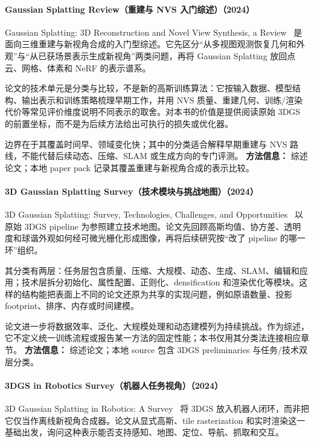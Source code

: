 \paragraph{Gaussian Splatting Review（重建与 NVS 入门综述）（2024）}
Gaussian Splatting: 3D Reconstruction and Novel View Synthesis, a Review~\cite{2405_03417} 是面向三维重建与新视角合成的入门型综述。它先区分“从多视图观测恢复几何和外观”与“从已获场景表示生成新视角”两类问题，再将 Gaussian Splatting 放回点云、网格、体素和 NeRF 的表示谱系。

论文的技术单元是分类与比较，不是新的高斯训练算法：它按输入数据、模型结构、输出表示和训练策略梳理早期工作，并用 NVS 质量、重建几何、训练/渲染代价等常见评价维度说明不同表示的取舍。对本书的价值是提供阅读原始 3DGS 的前置坐标，而不是为后续方法给出可执行的损失或优化器。

边界在于其覆盖时间早、领域变化快；其中的分类适合解释早期重建与 NVS 路线，不能代替后续动态、压缩、SLAM 或生成方向的专门评测。
\textbf{方法信息：} 综述论文；本地 paper pack 记录其覆盖重建与新视角合成的表示比较。
\paragraph{3D Gaussian Splatting Survey（技术模块与挑战地图）（2024）}
3D Gaussian Splatting: Survey, Technologies, Challenges, and Opportunities~\cite{2407_17418} 以原始 3DGS pipeline 为参照建立技术地图。论文先回顾高斯均值、协方差、透明度和球谐外观如何经可微光栅化形成图像，再将后续研究按“改了 pipeline 的哪一环”组织。

其分类有两层：任务层包含质量、压缩、大规模、动态、生成、SLAM、编辑和应用；技术层拆分初始化、属性配置、正则化、densification 和渲染优化等模块。这样的结构能把表面上不同的论文还原为共享的实现问题，例如原语数量、投影 footprint、排序、内存或时间建模。

论文进一步将数据效率、泛化、大规模处理和动态建模列为持续挑战。作为综述，它不定义统一训练流程或报告某一方法的固定性能；本书仅用其分类法连接相应章节。
\textbf{方法信息：} 综述论文；本地 source 包含 3DGS preliminaries 与任务/技术双层分类。
\paragraph{3DGS in Robotics Survey（机器人任务视角）（2024）}
3D Gaussian Splatting in Robotics: A Survey~\cite{2410_12262} 将 3DGS 放入机器人闭环，而非把它仅当作离线新视角合成器。论文从显式高斯、tile rasterization 和实时渲染这一基础出发，询问这种表示能否支持感知、地图、定位、导航、抓取和交互。

